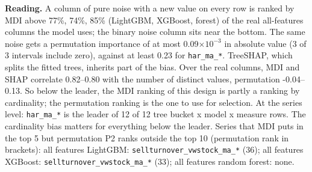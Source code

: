 \documentclass[10pt]{article}
\begin{document}
\textbf{Reading.} A column of pure noise with a new value on every row is ranked by MDI above 77\%, 74\%, 85\% (LightGBM, XGBoost, forest) of the real all-features columns the model uses; the binary noise column sits near the bottom. The same noise gets a permutation importance of at most 0.09$\times10^{-3}$ in absolute value (3 of 3 intervals include zero), against at least 0.23 for \texttt{har\_ma\_*}. TreeSHAP, which splits the fitted trees, inherits part of the bias. Over the real columns, MDI and SHAP correlate 0.82--0.80 with the number of distinct values, permutation -0.04--0.13. So below the leader, the MDI ranking of this design is partly a ranking by cardinality; the permutation ranking is the one to use for selection. At the series level: \texttt{har\_ma\_*} is the leader of 12 of 12 tree bucket x model x measure rows. The cardinality bias matters for everything below the leader. Series that MDI puts in the top 5 but permutation P2 ranks outside the top 10 (permutation rank in brackets): all features LightGBM: \texttt{sellturnover\_vwstock\_ma\_*} (36); all features XGBoost: \texttt{sellturnover\_vwstock\_ma\_*} (33); all features random forest: none.
\end{document}
